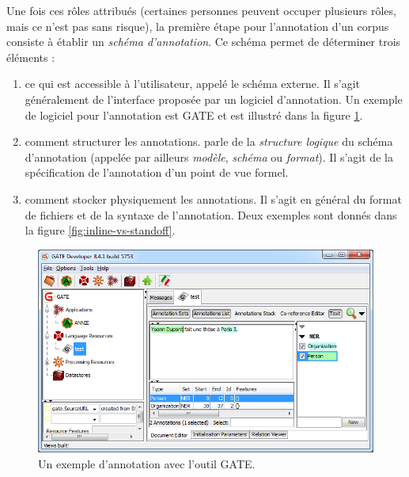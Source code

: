 \documentclass[12pt,a4paper,times,twoside,openright]{report}
\begin{document}
Une fois ces rôles attribués (certaines personnes peuvent occuper plusieurs rôles, mais ce n'est pas sans risque), la première étape pour l'annotation d'un corpus consiste à établir un \emph{schéma d'annotation}. Ce schéma permet de déterminer trois éléments :

\begin{enumerate}
    \item ce qui est accessible à l'utilisateur, appelé le schéma externe. Il s'agit généralement de l'interface proposée par un logiciel d'annotation. Un exemple de logiciel pour l'annotation est GATE \citep{cunningham2002gate} et est illustré dans la figure \ref{fig:gate-annotation}.
    \item comment structurer les annotations. \citet{fort2012ressources} parle de la \emph{structure logique} du schéma d'annotation (appelée par ailleurs \emph{modèle}, \emph{schéma} ou \emph{format}). Il s'agit de la spécification de l'annotation d'un point de vue formel.
    \item comment stocker physiquement les annotations. Il s'agit en général du format de fichiers et de la syntaxe de l'annotation. Deux exemples sont donnés dans la figure \ref{fig:inline-vs-standoff}.
\end{enumerate}

\begin{figure}[ht!]
    \centering
    \includegraphics[scale=0.66]{images/fort/gate1}
    \caption{Un exemple d'annotation avec l'outil GATE.}
    \label{fig:gate-annotation}
\end{figure}
\end{document}
